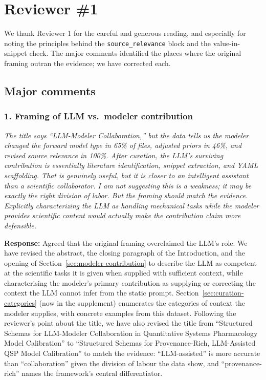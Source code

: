 \documentclass[11pt]{article}
\newcommand{\reviewer}[1]{\textcolor{reviewercolor}{\textit{#1}}}
\newcommand{\response}[1]{\textcolor{responsecolor}{\textbf{Response:} #1}}
\begin{document}
\bigskip

\section*{Reviewer \#1}

We thank Reviewer 1 for the careful and generous reading, and especially for noting the principles behind the \texttt{source\_relevance} block and the value-in-snippet check. The major comments identified the places where the original framing outran the evidence; we have corrected each.

\subsection*{Major comments}

\subsubsection*{1. Framing of LLM vs.\ modeler contribution}

\reviewer{The title says ``LLM-Modeler Collaboration,'' but the data tells us the modeler changed the forward model type in 65\% of files, adjusted priors in 46\%, and revised source relevance in 100\%. After curation, the LLM's surviving contribution is essentially literature identification, snippet extraction, and YAML scaffolding. That is genuinely useful, but it is closer to an intelligent assistant than a scientific collaborator. I am not suggesting this is a weakness; it may be exactly the right division of labor. But the framing should match the evidence. Explicitly characterizing the LLM as handling mechanical tasks while the modeler provides scientific content would actually make the contribution claim more defensible.}

\response{Agreed that the original framing overclaimed the LLM's role. We have revised the abstract, the closing paragraph of the Introduction, and the opening of Section~\ref{sec:modeler-contribution} to describe the LLM as competent at the scientific tasks it is given when supplied with sufficient context, while characterising the modeler's primary contribution as supplying or correcting the context the LLM cannot infer from the static prompt. Section~\ref{sec:curation-categories} (now in the supplement) enumerates the categories of context the modeler supplies, with concrete examples from this dataset. Following the reviewer's point about the title, we have also revised the title from ``Structured Schemas for LLM-Modeler Collaboration in Quantitative Systems Pharmacology Model Calibration'' to ``Structured Schemas for Provenance-Rich, LLM-Assisted QSP Model Calibration'' to match the evidence: ``LLM-assisted'' is more accurate than ``collaboration'' given the division of labour the data show, and ``provenance-rich'' names the framework's central differentiator.}
\end{document}
